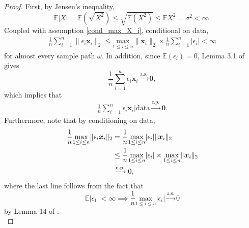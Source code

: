 \documentclass[12pt]{article}
\newcommand{\EX}{\mathbb{E}} %
\newcommand{\sumin}{\sum_{i=1}^n} %
\newcommand{\dn}{\frac{1}{n}} %
\newcommand{\CONV}[1]{\stackrel{\text{#1}}{\longrightarrow}} %
\newcommand{\x}{\bm{x}_i} %
\begin{document}
\begin{proof}
	First, by Jensen's inequality, 
		$$
		\EX |X| = \EX (\sqrt{X^2}) 
				\leq \sqrt{\EX (X^2)} 
				\leq \EX X^2
				= \sigma^2 
				< \infty.
		$$
	Coupled with assumption \eqref{cond_max_X_i}, conditional on data,
	\begin{align} \label{constraint1} 
		\dn \sumin \|\epsilon_i \x \|_2
		\leq \underset{1 \leq i \leq n}{\text{max}} \|\x \|_2  
			\times \dn \sumin |\epsilon_i| 
		< \infty
	\end{align}
	for almost every sample path $\omega$. In addition, since $\EX(\epsilon_i) = 0$, Lemma 3.1 of \citet{Chatterjee&Lahiri} gives
		$$
		\dn \sumin \epsilon_i \x
		\CONV{a.s.} \bm{0},
		$$
	which implies that 
	\begin{align} \label{constraint2}
	\dn 
	\sumin \epsilon_i \x
	\bigg| \text{data}
	\CONV{c.p.} \bm{0}.
	\end{align}
	Furthermore, note that by conditioning on data, 
	\begin{align} \label{constraint3} 
	\dn \underset{1 \leq i \leq n}{\text{max}}  \|\epsilon_i \x \|_2 
	&= \dn \underset{1 \leq i \leq n}{\text{max}} |\epsilon_i| \|\x\|_2 \notag \\ 
	&\leq \dn \underset{1 \leq i \leq n}{\text{max}} |\epsilon_i| 
		\times \underset{1 \leq i \leq n}{\text{max}} \|\x\|_2 \notag \\
	&\CONV{c.p.} 0,
	\end{align}
	where the last line follows from the fact that 
	$$
	\EX |\epsilon_1| < \infty
	\implies 
	\dn \underset{1 \leq i \leq n}{\text{max}} |\epsilon_i| \CONV{a.s.} 0
	$$ 
	by Lemma 14 of \citet{newton1991}. \\
	

\end{proof}
\end{document}
